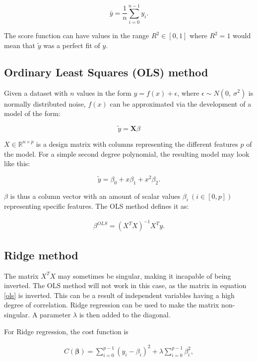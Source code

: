 \documentclass[reprint,english,notitlepage]{revtex4-1}  %
\begin{document}
\[
\bar{y} =  \frac{1}{n} \sum_{i=0}^{n - 1} y_i.
\]

The score function can have values in the range $R^2 \in [0, 1]$ where $R^2 = 1$ would mean that $\tilde{y}$ was a perfect fit of $y$.

\subsection{Ordinary Least Squares (OLS) method}

Given a dataset with $n$ values in the form $y = f(x) + \epsilon$, where $\epsilon \sim N(0, \ \sigma^2)$ is normally distributed noise, $f(x)$ can be approximated via the development of a model of the form:

\begin{equation} \label{eq:predict}
    \tilde{y} = \bm{X}\beta
\end{equation}


$X \in \mathbb{R}^{n \times p}$ is a design matrix with columns representing the different features $p$ of the model. For a simple second degree polynomial, the resulting model may look like this:

$$\tilde{y} = \beta_0 + x\beta_1 + x^2\beta_2.$$

$\beta$ is thus a column vector with an amount of scalar values $\beta_i \ (i \in [0, p])$ representing specific features. The OLS method defines it as:



\begin{align}
    \label{ols}
    \beta^{OLS} = (X^TX)^{-1}X^Ty.
\end{align}


\subsection{Ridge method}


The matrix $X^TX$ may sometimes be singular, making it incapable of being inverted. The OLS method will not work in this case, as the matrix in equation \ref{ols} is inverted. This can be a result of independent variables having a high degree of correlation. Ridge regression can be used to make the matrix non-singular. A parameter $\lambda$ is then added to the diagonal.



For Ridge regression, the cost function is


\begin{align}
    C(\boldsymbol{\beta})=\sum_{i=0}^{p-1}(y_i-\beta_i)^2+\lambda\sum_{i=0}^{p-1}\beta_i^2,
\end{align}
\end{document}

